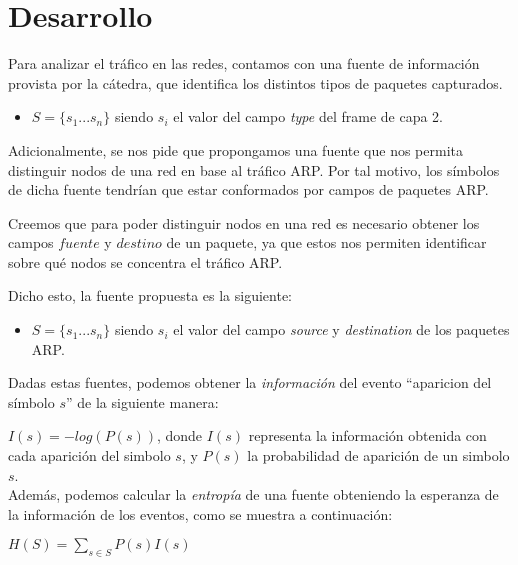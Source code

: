 \section{Desarrollo}

Para analizar el tráfico en las redes, contamos con una fuente de información provista por la cátedra, que identifica los distintos tipos de paquetes capturados.

\begin{itemize}
\item $S=\{s_1 ... s_n\}$ siendo $s_i$ el valor del campo \textit{type} del frame de capa 2.\\
\end{itemize}

Adicionalmente, se nos pide que propongamos una fuente que nos permita distinguir nodos de una red en base al tráfico ARP. Por tal motivo, los símbolos de dicha fuente tendrían que estar conformados por campos de paquetes ARP.

Creemos que para poder distinguir nodos en una red es necesario obtener los campos $fuente$ y $destino$ de un paquete, ya que estos nos permiten identificar sobre qué nodos se concentra el tráfico ARP.

Dicho esto, la fuente propuesta es la siguiente:

\begin{itemize}
\item $S=\{s_1 ... s_n\}$ siendo $s_i$ el valor del campo \textit{source} y \textit{destination} de los paquetes ARP.\\
\end{itemize}


Dadas estas fuentes, podemos obtener la \textit{información} del evento ``aparicion del símbolo $s$'' de la siguiente manera:

$I(s) = -log(P(s))$, donde $I(s)$ representa la información obtenida con cada aparición del simbolo $s$, y $P(s)$ la probabilidad de aparición de un simbolo $s$.\\

Además, podemos calcular la \textit{entropía} de una fuente obteniendo la esperanza de la información de los eventos, como se muestra a continuación:

$H(S) = \sum_{s \in S} P(s) I(s)$


